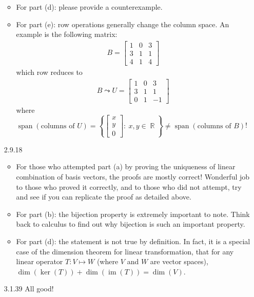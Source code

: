 \documentclass{amsart}
\theoremstyle{definition}
\theoremstyle{definition}
\DeclareMathOperator{\R}{\mathbb{R}}
\DeclareMathOperator{\im}{im}
\DeclareMathOperator{\1}{\mathbbm{1}}
\DeclareMathOperator{\Span}{span}
\newcommand{\condset}[4]{\left\{ #1  : \: #2 #3 #4 \right\}}
\begin{document}
\begin{enumerate}
\begin{itemize}
		\item For part (d): please provide a counterexample.
		
		\item For part (e): row operations generally change the column space. An example is the following matrix:
		\begin{align*}
		B = \begin{bmatrix}
		1 & 0 & 3 \\ 3 & 1 & 1 \\ 4 & 1 & 4
		\end{bmatrix}
		\end{align*}
		which row reduces to 
		\begin{align*}
		B \leadsto U = \begin{bmatrix}
		1 & 0 & 3 \\ 3 & 1 & 1 \\ 0 & 1 & -1
		\end{bmatrix}
		\end{align*}
		where $\Span(\text{columns of } U) = \condset{\begin{bmatrix}
			x \\ y \\ 0
			\end{bmatrix}}{x,y}{\in}{\R} \neq \Span(\text{columns of } B)$!
	\end{itemize}
	
	
	
	
	\item[2.9.18] \begin{itemize}
		\item For those who attempted part (a) by proving the uniqueness of linear combination of basis vectors, the proofs are mostly correct! Wonderful job to those who proved it correctly, and to those who did not attempt, try and see if you can replicate the proof as detailed above.
		
		\item For part (b): the bijection property is extremely important to note. Think back to calculus to find out why bijection is such an important property.
		
		\item For part (d): the statement is not true by definition. In fact, it is a special case of the dimension theorem for linear transformation, that for any linear operator $T:V \mapsto W$ (where $V$ and $W$ are vector spaces), $\dim(\ker(T)) + \dim(\im(T)) = \dim(V)$.
	\end{itemize}
	
	
	\item[3.1.39] All good!
	

\end{enumerate}
\end{document}
